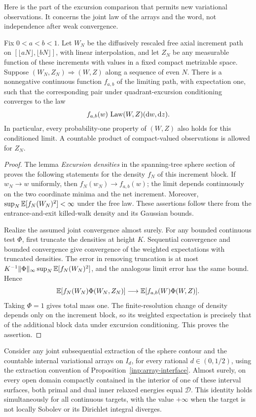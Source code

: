 Here is the part of the excursion comparison that permits new
variational observations.  It concerns the joint law of the arrays
and the word, not independence after weak convergence.

\begin{lemma}
\label{sph:block-density}
Fix $0<a<b<1$.  Let $W_N$ be the diffusively rescaled free axial
increment path on $[\lfloor aN\rfloor,\lfloor bN\rfloor]$, with
linear interpolation, and let $Z_N$ be any measurable function of
these increments with values in a fixed compact metrizable space.
Suppose $(W_N,Z_N)\Rightarrow(W,Z)$ along a sequence of even $N$.
There is a nonnegative continuous function $f_{a,b}$ of the limiting
path, with expectation one, such that the corresponding pair under
quadrant-excursion conditioning converges to the law
\[
 f_{a,b}(w)\,\operatorname{Law}(W,Z)(\mathrm d w,\mathrm d z).
\]
In particular, every probability-one property of $(W,Z)$ also
holds for this conditioned limit.  A countable product of
compact-valued observations is allowed for $Z_N$.
\end{lemma}

\begin{proof}
The lemma \emph{Excursion densities} in the spanning-tree sphere
section of \cite{MetricMaps} proves the following statements for
the density $f_N$ of this increment block.  If $w_N\to w$
uniformly, then $f_N(w_N)\to f_{a,b}(w)$; the limit depends
continuously on the two coordinate minima and the net increment.
Moreover, $\sup_N\mathbb E[f_N(W_N)^2]<\infty$ under the free law.
These assertions follow there from the entrance-and-exit killed-walk
density and its Gaussian bounds.

Realize the assumed joint convergence almost surely.  For any bounded
continuous test $\Phi$, first truncate the densities at height $K$.
Sequential convergence and bounded convergence give convergence of
the weighted expectations with truncated densities.  The error in
removing truncation is at most
$K^{-1}\|\Phi\|_\infty\sup_N\mathbb E[f_N(W_N)^2]$, and the analogous
limit error has the same bound.  Hence
\[
 \mathbb E[f_N(W_N)\Phi(W_N,Z_N)]
 \longrightarrow\mathbb E[f_{a,b}(W)\Phi(W,Z)].
\]
Taking $\Phi=1$ gives total mass one.  The finite-resolution
change of density depends only on the increment block, so its
weighted expectation is precisely that of the additional block
data under excursion conditioning.  This proves the assertion.
\end{proof}

\begin{proposition}
\label{sph:transfer}
Consider any joint subsequential extraction of the sphere contour and
the countable internal variational arrays on $I_d$, for every rational
$d\in(0,1/2)$, using the extraction convention of
Proposition~\ref{inp:array-interface}.  Almost surely, on every open
domain compactly contained in the interior of one of these interval
surfaces, both primal and dual inner relaxed energies equal
$\mathcal D$.  This identity holds simultaneously for all continuous
targets, with the value $+\infty$ when the target is not locally
Sobolev or its Dirichlet integral diverges.
\end{proposition}

